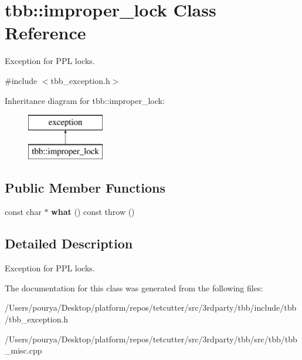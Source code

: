 \hypertarget{classtbb_1_1improper__lock}{}\section{tbb\+:\+:improper\+\_\+lock Class Reference}
\label{classtbb_1_1improper__lock}


Exception for P\+P\+L locks.  




{\ttfamily \#include $<$tbb\+\_\+exception.\+h$>$}

Inheritance diagram for tbb\+:\+:improper\+\_\+lock\+:\begin{figure}[H]
\begin{center}
\leavevmode
\includegraphics[height=2.000000cm]{classtbb_1_1improper__lock}
\end{center}
\end{figure}
\subsection*{Public Member Functions}
\begin{DoxyCompactItemize}
\item 
\hypertarget{classtbb_1_1improper__lock_a1eaab512987f0006623eabd9091c0976}{}const char $\ast$ {\bfseries what} () const   throw ()\label{classtbb_1_1improper__lock_a1eaab512987f0006623eabd9091c0976}

\end{DoxyCompactItemize}


\subsection{Detailed Description}
Exception for P\+P\+L locks. 

The documentation for this class was generated from the following files\+:\begin{DoxyCompactItemize}
\item 
/\+Users/pourya/\+Desktop/platform/repos/tetcutter/src/3rdparty/tbb/include/tbb/tbb\+\_\+exception.\+h\item 
/\+Users/pourya/\+Desktop/platform/repos/tetcutter/src/3rdparty/tbb/src/tbb/tbb\+\_\+misc.\+cpp\end{DoxyCompactItemize}
